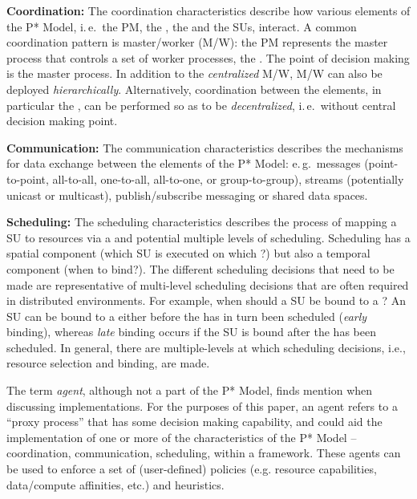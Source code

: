 \documentclass[conference]{IEEEtran}
\begin{document}

\textbf{Coordination:} The coordination characteristics describe how
various elements of the P* Model, i.\,e.\ the PM, the \pilot, the \cus
and the SUs, interact. A common coordination pattern is master/worker
(M/W): the PM represents the master process that controls a set of
worker processes, the \pilots. The point of decision making is the
master process. In addition to the \emph{centralized} M/W, M/W can
also be deployed \emph{hierarchically}.  Alternatively, coordination
between the elements, in particular the \pilots, can be performed so as
to be \emph{decentralized}, i.\,e.\ without central decision making
point.

%

\textbf{Communication:} The communication characteristics describes the
mechanisms for data exchange between the elements of the P* Model:
e.\,g.\ messages (point-to-point, all-to-all, one-to-all, all-to-one,
or group-to-group), streams (potentially unicast or multicast),
publish/subscribe messaging or shared data spaces.
		
\textbf{Scheduling:} The scheduling characteristics describes the
process of mapping a SU to resources via a \pilot and potential
multiple levels of scheduling. Scheduling has a spatial component
(which SU is executed on which \pilot?) but also a temporal component
(when to bind?). The different scheduling decisions that need to be
made are representative of multi-level scheduling decisions that are
often required in distributed environments.  For example, when should
a SU be bound to a \pilot?  An SU can be bound to a \pilot either before
the \pilot has in turn been scheduled ({\it early} binding), whereas
{\it late} binding occurs if the SU is bound after the \pilot has been
scheduled.  In general, there are multiple-levels at which scheduling
decisions, i.e., resource selection and binding, are made.

The term {\it agent}, although not a part of the P* Model, finds
mention when discussing implementations. For the purposes of this
paper, an agent refers to a ``proxy process'' 
that has some decision making capability, and could aid the
implementation of one or more of the characteristics of the P* Model
-- coordination, communication, scheduling, within a \pilotjob
framework.  These agents can be used to enforce a set of
(user-defined) policies (e.g.  resource capabilities, data/compute
affinities, etc.) and heuristics.
\end{document}
